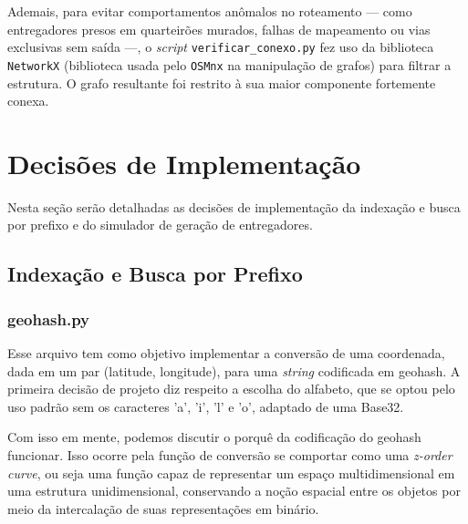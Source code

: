 \documentclass[12pt,a4paper]{article}
\begin{document}
Ademais, para evitar comportamentos anômalos no roteamento — como entregadores presos em quarteirões murados, falhas de mapeamento ou vias exclusivas sem saída —, o \textit{script} \texttt{verificar\_conexo.py} fez uso da biblioteca \texttt{NetworkX} (biblioteca usada pelo \texttt{OSMnx} na manipulação de grafos) para filtrar a estrutura. O grafo resultante foi restrito à sua maior componente fortemente conexa.
\section{Decisões de Implementação}
Nesta seção serão detalhadas as decisões de implementação da indexação e busca por prefixo e do simulador de geração de entregadores.
\subsection{Indexação e Busca por Prefixo}
\subsubsection{geohash.py}
Esse arquivo tem como objetivo implementar a conversão de uma coordenada, dada em um par (latitude, longitude), para uma \textit{string} 
codificada em geohash. A primeira decisão de projeto diz respeito a escolha do alfabeto, que se optou pelo uso padrão sem os caracteres 'a', 'i', 'l' e 'o',
adaptado de uma Base32. 

Com isso em mente, podemos discutir o porquê da codificação do geohash funcionar. Isso ocorre pela função de conversão se comportar como uma \textit{z-order curve},
ou seja uma função capaz de representar um espaço multidimensional em uma estrutura unidimensional, conservando a noção espacial entre os objetos por meio 
da intercalação de suas representações em binário. 
\end{document}
